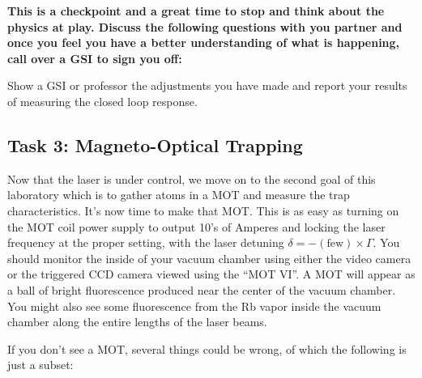 \documentclass{../lab}
\begin{document}
\textbf{This is a checkpoint and a great time to stop and think about the physics at play. Discuss the following questions with you partner and once you feel you have a better understanding of what is happening, call over a GSI to sign you off:}

Show a GSI or professor the adjustments you have made and report your results of measuring the closed loop response.

\subsection{Task 3: Magneto-Optical Trapping}

Now that the laser is under control, we move on to the second goal of this laboratory which is to gather atoms in a MOT and measure the trap characteristics. It's now time to make that MOT. This is as easy as turning on the MOT coil power supply to output 10's of Amperes and locking the laser frequency at the proper setting, with the laser detuning $\delta = - (\text{few}) \times \Gamma $. You should monitor the inside of your vacuum chamber using either the video camera or the triggered CCD camera viewed using the ``MOT VI''. A MOT will appear as a ball of bright fluorescence produced near the center of the vacuum chamber. You might also see some fluorescence from the Rb vapor inside the vacuum chamber along the entire lengths of the laser beams.

If you don't see a MOT, several things could be wrong, of which the following is just a subset:
\end{document}
